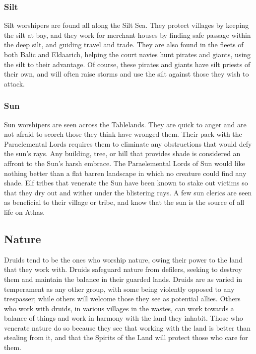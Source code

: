 \subsubsection{Silt}
Silt worshipers are found all along the Silt Sea. They protect villages by keeping the silt at bay, and they work for merchant houses by finding safe passage within the deep silt, and guiding travel and trade. They are also found in the fleets of both Balic and Eldaarich, helping the court navies hunt pirates and giants, using the silt to their advantage. Of course, these pirates and giants have silt priests of their own, and will often raise storms and use the silt against those they wish to attack.

\subsubsection{Sun}
Sun worshipers are seen across the Tablelands. They are quick to anger and are not afraid to scorch those they think have wronged them. Their pack with the Paraelemental Lords requires them to eliminate any obstructions that would defy the sun's rays. Any building, tree, or hill that provides shade is considered an affront to the Sun's harsh embrace. The Paraelemental Lords of Sun would like nothing better than a flat barren landscape in which no creature could find any shade. Elf tribes that venerate the Sun have been known to stake out victims so that they dry out and wither under the blistering rays. A few sun clerics are seen as beneficial to their village or tribe, and know that the sun is the source of all life on Athas.

\subsection{Nature}
Druids tend to be the ones who worship nature, owing their power to the land that they work with. Druids safeguard nature from defilers, seeking to destroy them and maintain the balance in their guarded lands. Druids are as varied in temperament as any other group, with some being violently opposed to any trespasser; while others will welcome those they see as potential allies. Others who work with druids, in various villages in the wastes, can work towards a balance of things and work in harmony with the land they inhabit. Those who venerate nature do so because they see that working with the land is better than stealing from it, and that the Spirits of the Land will protect those who care for them.

